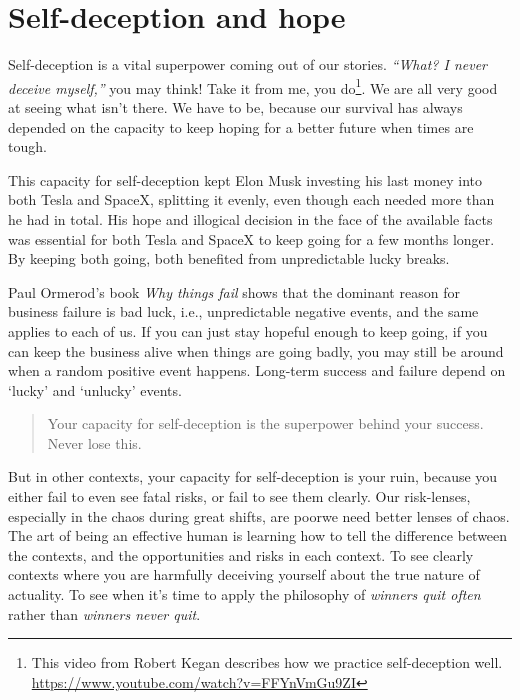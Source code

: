 \section{Self-deception and hope}
\label{self-deception}
Self-deception  is a vital superpower coming out of our stories. \emph{“What? I never deceive myself,”} you may think! Take it from me, you do\footnote{This video from Robert Kegan  describes how we practice self-deception well. \url{https://www.youtube.com/watch?v=FFYnVmGu9ZI}}. We are all very good at seeing what isn't there\cite{wiseman-paranormality}. We have to be, because our survival has always depended on the capacity to keep hoping for a better future when times are tough. 


This capacity for self-deception kept Elon Musk investing his last money into both Tesla and SpaceX, splitting it evenly, even though each needed more than he had in total. His hope and illogical decision in the face of the available facts was essential for both Tesla and SpaceX to keep going for a few months longer. By keeping both going, both benefited from unpredictable lucky breaks. 


Paul Ormerod's book\cite{ormerod-why-fail} \emph{Why things fail}  shows that the dominant reason for business failure is bad luck, i.e., unpredictable negative events, and the same applies to each of us. If you can just stay hopeful enough to keep going, if you can keep the business alive when things are going badly, you may still be around when a random positive event happens. Long-term success and failure depend on ‘lucky’ and ‘unlucky’ events. 


\begin{quote}
Your capacity for self-deception is the superpower behind your success. Never lose this.
\end{quote}


But in other contexts, your capacity for self-deception is your ruin, because you either fail to even see fatal risks, or fail to see them clearly. Our risk-lenses, especially in the chaos during great shifts, are poor\textemdash we need better lenses of chaos. The art of being an effective human is learning how to tell the difference between the contexts, and the opportunities and risks\cite{schrager-brothel} in each context. To see clearly contexts where you are harmfully deceiving yourself about the true nature of actuality. To see when it's time to apply the philosophy of \emph{winners quit often} rather than \emph{winners never quit}\cite{godin-dip}.


